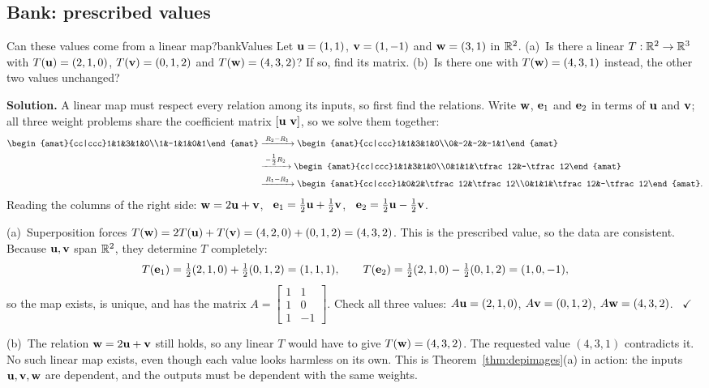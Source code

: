\documentclass[11pt]{article}
\begin{document}
\subsection*{Bank: prescribed values}

\begin{exmp}{Can these values come from a linear map?}{bankValues}
Let $\mathbf{u}=(1,1)$, $\mathbf{v}=(1,-1)$ and $\mathbf{w}=(3,1)$ in $\mathbb{R}^2$. (a)~Is there a linear $T:\mathbb{R}^2\to\mathbb{R}^3$ with $T(\mathbf{u})=(2,1,0)$, $T(\mathbf{v})=(0,1,2)$ and $T(\mathbf{w})=(4,3,2)$? If so, find its matrix. (b)~Is there one with $T(\mathbf{w})=(4,3,1)$ instead, the other two values unchanged?

\textbf{Solution.} A linear map must respect every relation among its inputs, so first find the relations. Write $\mathbf{w}$, $\mathbf{e}_1$ and $\mathbf{e}_2$ in terms of $\mathbf{u}$ and $\mathbf{v}$; all three weight problems share the coefficient matrix $[\mathbf{u}\ \mathbf{v}]$, so we solve them together:
\begin{align*}
\begin{amat}{cc|ccc}1&1&3&1&0\\1&-1&1&0&1\end{amat}
&\rops{R_2-R_1}
\begin{amat}{cc|ccc}1&1&3&1&0\\0&-2&-2&-1&1\end{amat}\\
&\rops{-\tfrac12R_2}
\begin{amat}{cc|ccc}1&1&3&1&0\\0&1&1&\tfrac12&-\tfrac12\end{amat}\\
&\rops{R_1-R_2}
\begin{amat}{cc|ccc}1&0&2&\tfrac12&\tfrac12\\0&1&1&\tfrac12&-\tfrac12\end{amat}.
\end{align*}
Reading the columns of the right side: $\mathbf{w}=2\mathbf{u}+\mathbf{v}$, \ $\mathbf{e}_1=\tfrac12\mathbf{u}+\tfrac12\mathbf{v}$, \ $\mathbf{e}_2=\tfrac12\mathbf{u}-\tfrac12\mathbf{v}$.

(a)~Superposition forces $T(\mathbf{w})=2T(\mathbf{u})+T(\mathbf{v})=(4,2,0)+(0,1,2)=(4,3,2)$. This is the prescribed value, so the data are consistent. Because $\mathbf{u},\mathbf{v}$ span $\mathbb{R}^2$, they determine $T$ completely:
\[
T(\mathbf{e}_1)=\tfrac12(2,1,0)+\tfrac12(0,1,2)=(1,1,1),\qquad T(\mathbf{e}_2)=\tfrac12(2,1,0)-\tfrac12(0,1,2)=(1,0,-1),
\]
so the map exists, is unique, and has the matrix $A=\begin{bmatrix}1&1\\1&0\\1&-1\end{bmatrix}$. Check all three values: $A\mathbf{u}=(2,1,0)$, $A\mathbf{v}=(0,1,2)$, $A\mathbf{w}=(4,3,2)$. \ $\checkmark$

(b)~The relation $\mathbf{w}=2\mathbf{u}+\mathbf{v}$ still holds, so any linear $T$ would have to give $T(\mathbf{w})=(4,3,2)$. The requested value $(4,3,1)$ contradicts it. No such linear map exists, even though each value looks harmless on its own. This is Theorem~\ref{thm:depimages}(a) in action: the inputs $\mathbf{u},\mathbf{v},\mathbf{w}$ are dependent, and the outputs must be dependent with the same weights.
\end{exmp}
\end{document}

